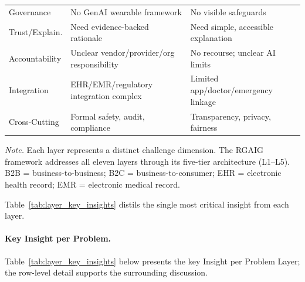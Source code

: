 {\begin{xltabular}{\textwidth}{@{} >{\raggedright\arraybackslash}p{3.2cm} L L @{}}
\addlinespace
Governance & No GenAI wearable framework & No visible safeguards \\
\addlinespace
Trust/Explain. & Need evidence-backed rationale & Need simple, accessible explanation \\
\addlinespace
Accountability & Unclear vendor/provider/org responsibility & No recourse; unclear AI limits \\
\addlinespace
Integration & EHR/EMR/regulatory integration complex & Limited app/doctor/emergency linkage \\
\addlinespace
Cross-Cutting & Formal safety, audit, compliance & Transparency, privacy, fairness \\
\end{xltabular}}
\vspace{0.5em}
\noindent\textit{Note.} Each layer represents a distinct challenge dimension. The RGAIG framework addresses all eleven layers through its five-tier architecture (L1--L5). B2B = business-to-business; B2C = business-to-consumer; EHR = electronic health record; EMR = electronic medical record.

Table~\ref{tab:layer_key_insights} distils the single most critical insight from each layer.

\paragraph{Key Insight per Problem.}



\noindent Table~\ref{tab:layer_key_insights} below presents the key Insight per Problem Layer; the row-level detail supports the surrounding discussion.

